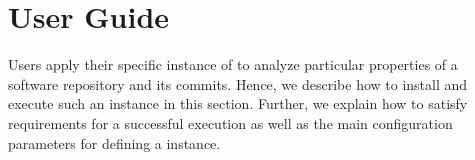 \section{User Guide}
\label{sec:UserGuide}
Users apply their specific instance of \thetool{} to analyze particular properties of a software repository and its commits.
Hence, we describe how to install and execute such an instance in this section.
Further, we explain how to satisfy requirements for a successful execution as well as the main configuration parameters for defining a \thetool{} instance.


